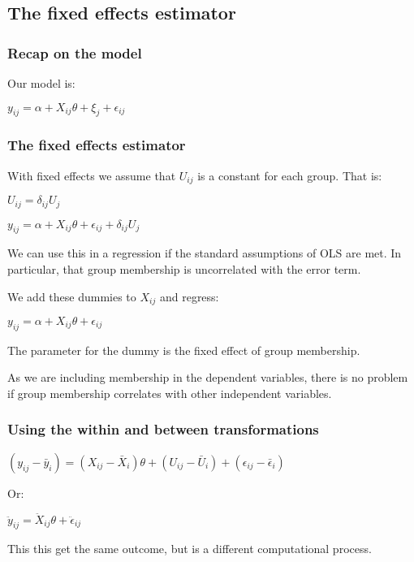 
\subsection{The fixed effects estimator}
\subsubsection{Recap on the model}

Our model is:

\(y_{ij}=\alpha + X_{ij}\theta + \xi_j + \epsilon_{ij}\)

\subsubsection{The fixed effects estimator}

With fixed effects we assume that \(U_{ij}\) is a constant for each group. That is:

\(U_{ij}=\delta_{ij}U_j\)

\(y_{ij}=\alpha + X_{ij}\theta +\epsilon_{ij}+\delta_{ij}U_{j}\)

We can use this in a regression if the standard assumptions of OLS are met. In particular, that group membership is uncorrelated with the error term.

We add these dummies to \(X_{ij}\) and regress:

\(y_{ij}=\alpha + X_{ij}\theta +\epsilon_{ij}\)

The parameter for the dummy is the fixed effect of group membership.

As we are including membership in the dependent variables, there is no problem if group membership correlates with other independent variables.

\subsubsection{Using the within and between transformations}

\((y_{ij}-\bar y_{i})=(X_{ij}-\bar X_{i})\theta +(U_{ij} -\bar U_{i}) +(\epsilon_{ij}-\bar \epsilon_{i})\)

Or:

\(\ddot y_{ij}=\ddot X_{ij}\theta +\ddot \epsilon_{ij}\)

This this get the same outcome, but is a different computational process.

